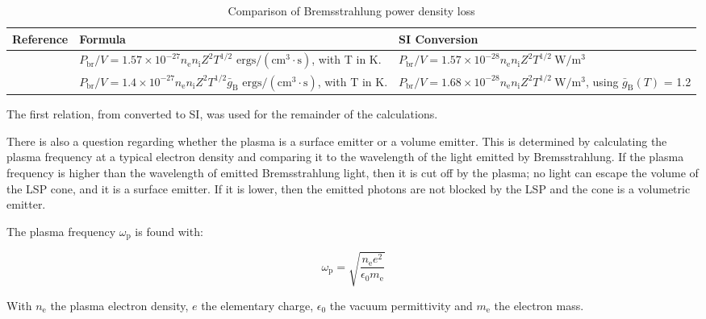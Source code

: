        \begin{table}[!ht]
            \footnotesize
            \centering
            \caption{Comparison of Bremsstrahlung power density loss}
            \label{tab:Brems_compare}
            \begin{tabularx}{\textwidth}{@{}lXX@{}}
            \toprule
            \textbf{Reference} & \textbf{Formula} & \textbf{SI Conversion} \\ \midrule
            \textcite{glasstoneControlledThermonuclearReactions1975}  & $P_\mathrm{br}/V = 1.57 \times 10^{-27} n_\mathrm{e} n_\mathrm{i} Z^2 T^{1/2}$ \: $\mathrm{ergs/(cm^3\cdot s)}$, with T in K. &   $P_\mathrm{br}/V = 1.57 \times 10^{-28} n_\mathrm{e} n_\mathrm{i} Z^2 T^{1/2} \: \mathrm{W/m^3}$  \\
            \textcite{rybickiRadiativeProcessesAstrophysics2004}      & $P_\mathrm{br}/V = 1.4 \times 10^{-27} n_\mathrm{e} n_\mathrm{i} Z^2 T^{1/2} \bar{g}_\mathrm{B}$ \: $\mathrm{ergs/(cm^3\cdot s)}$, with T in K.&  $P_\mathrm{br}/V = 1.68 \times 10^{-28} n_\mathrm{e} n_\mathrm{i} Z^2 T^{1/2} \: \mathrm{W/m^3}$, using $\bar{g}_\mathrm{B} (T)$ = 1.2\\
            \bottomrule          
            \end{tabularx}
        \end{table}

        The first relation, from \textcite{glasstoneControlledThermonuclearReactions1975} converted to SI, was used for the remainder of the calculations.

        There is also a question regarding whether the plasma is a surface emitter or a volume emitter. This is determined by calculating the plasma frequency at a typical electron density and comparing it to the wavelength of the light emitted by Bremsstrahlung. If the plasma frequency is higher than the wavelength of emitted Bremsstrahlung light, then it is cut off by the plasma; no light can escape the volume of the LSP cone, and it is a surface emitter. If it is lower, then the emitted photons are not blocked by the LSP and the cone is a volumetric emitter.
        
        The plasma frequency $\omega_\mathrm{p}$ is found with: 

        \begin{equation}
            \omega_\mathrm{p} = \sqrt{\frac{n_\mathrm{e} e^2}{\epsilon_\mathrm{0} m_\mathrm{e}}}
        \end{equation}

        With $n_\mathrm{e}$ the plasma electron density, $e$ the elementary charge, $\epsilon_\mathrm{0}$ the vacuum permittivity and $m_\mathrm{e}$ the electron mass.

